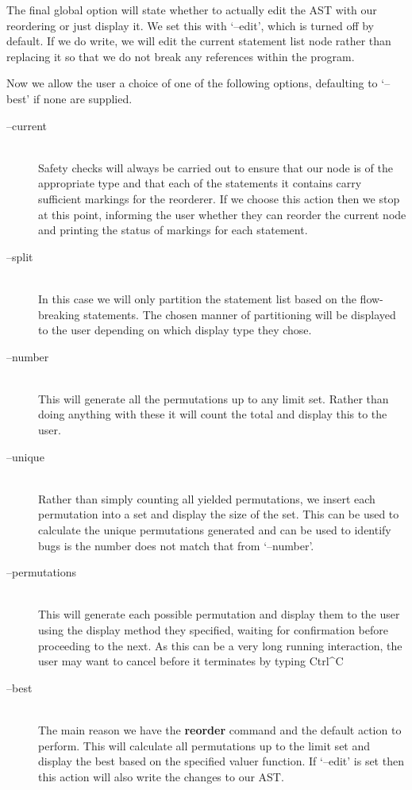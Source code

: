 \documentclass[twoside,a4paper]{report}
\begin{document}
The final global option will state whether to actually edit the AST with our reordering or just display it. We set this with `--edit', which is turned
off by default. If we do write, we will edit the current statement list node rather than replacing it so that we do not break any references within the
program.

Now we allow the user a choice of one of the following options, defaulting to `--best' if none are supplied.

\begin{description}
\item[--current] \hfill \\
Safety checks will always be carried out to ensure that our node is of the appropriate type and that each of the statements it contains carry sufficient
markings for the reorderer. If we choose this action then we stop at this point, informing the user whether they can reorder the current node and printing
the status of markings for each statement.

\item[--split] \hfill \\
In this case we will only partition the statement list based on the flow-breaking statements. The chosen manner of partitioning will be displayed to the user
depending on which display type they chose.

\item[--number] \hfill \\
This will generate all the permutations up to any limit set. Rather than doing anything with these it will count the total and display this to the user.

\item[--unique] \hfill \\
Rather than simply counting all yielded permutations, we insert each permutation into a set and display the size of the set. This can be used to calculate
the unique permutations generated and can be used to identify bugs is the number does not match that from `--number'.

\item[--permutations] \hfill \\
This will generate each possible permutation and display them to the user using the display method they specified, waiting for confirmation before proceeding
to the next. As this can be a very long running interaction, the user may want to cancel before it terminates by typing Ctrl\^{}C

\item[--best] \hfill \\
The main reason we have the \textbf{reorder} command and the default action to perform. This will calculate all permutations up to the limit set and display
the best based on the specified valuer function. If `--edit' is set then this action will also write the changes to our AST.
\end{description}
\end{document}
